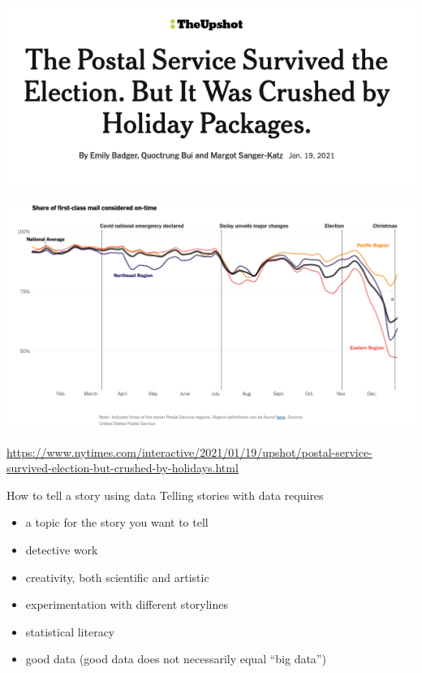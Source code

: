 \documentclass[table]{beamer}\usepackage[]{graphicx}\usepackage[]{color}
\begin{document}
\begin{frame}

\centering

\includegraphics[width=.6\textwidth]{figure-static/upshot-postal-banner.png}

\includegraphics[width=.9\textwidth]{figure-static/upshot-postal-timeseries.png}

\tiny \url{https://www.nytimes.com/interactive/2021/01/19/upshot/postal-service-survived-election-but-crushed-by-holidays.html}

\end{frame}





\begin{frame}{How to tell a story using data}
Telling stories with data requires
\begin{itemize}
    \item a topic for the story you want to tell
    \item detective work
    \item creativity, both scientific and artistic
    \item experimentation with different storylines
    \item statistical literacy
    \item good data (good data does not necessarily equal ``big data'')
\end{itemize}

\end{frame}
\end{document}
